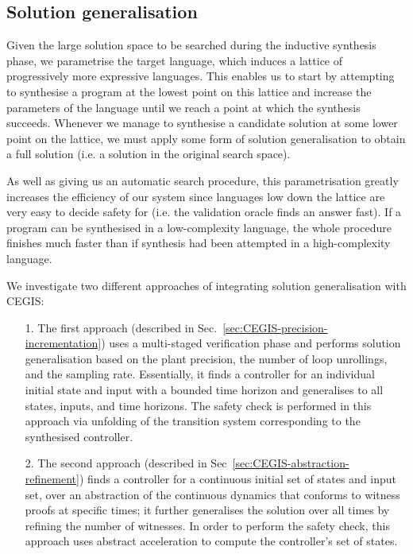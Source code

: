 \documentclass[runningheads,a4paper]{llncs}
\begin{document}
\subsection{Solution generalisation} 
Given the large solution space to be searched during the inductive
synthesis phase, we parametrise the target language, which induces a
lattice of progressively more expressive languages.  This enables us
to start by attempting to synthesise a program at the lowest point on
this lattice and increase the parameters of the language until we
reach a point at which the synthesis succeeds. Whenever we manage to
synthesise a candidate solution at some lower point on the lattice, we
must apply some form of solution generalisation to obtain a full
solution (i.e. a solution in the original search space).

As well as giving us an automatic search procedure, this
parametrisation greatly increases the efficiency of our system since
languages low down the lattice are very easy to decide safety for
(i.e. the validation oracle finds an answer fast). If a program can be
synthesised in a low-complexity language, the whole procedure finishes
much faster than if synthesis had been attempted in a high-complexity
language.


We investigate two different approaches of integrating solution generalisation 
with CEGIS:
\begin{itemize}
\item[1.] The first approach (described in Sec.~\ref{sec:CEGIS-precision-incrementation})
  uses a multi-staged verification phase and performs solution generalisation based on
the plant precision, the number of loop unrollings, 
and the sampling rate. Essentially, it finds a controller for an individual initial state
and input with a bounded time horizon and generalises to all states,
inputs, and time horizons. The safety check is performed in this approach 
via unfolding of the transition system corresponding to the synthesised controller.


\item[2.] The second approach (described in Sec~\ref{sec:CEGIS-abstraction-refinement})
  finds a controller for a continuous initial set of states and input
  set, over an abstraction of the continuous dynamics that conforms to
  witness proofs at specific times; it further generalises the
  solution over all times by refining the number of witnesses.  
  In order to perform the safety check, this approach uses abstract acceleration
  \cite{cattaruzza2015unbounded} to compute the controller's set of states. 
\end{itemize}
\end{document}
